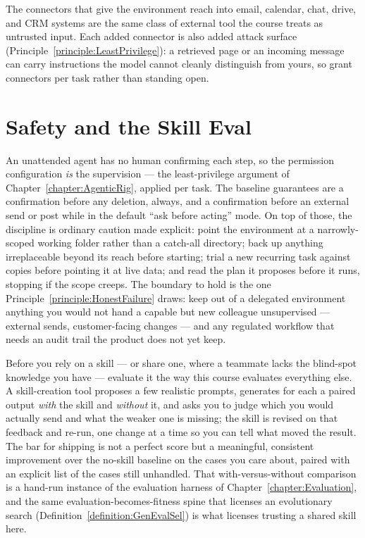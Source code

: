 The connectors that give the environment reach into email, calendar, chat, drive, and CRM systems are the same class of external tool the course treats as untrusted input.
Each added connector is also added attack surface (Principle~\ref{principle:LeastPrivilege}): a retrieved page or an incoming message can carry instructions the model cannot cleanly distinguish from yours, so grant connectors per task rather than standing open.

\section{Safety and the Skill Eval}

An unattended agent has no human confirming each step, so the permission configuration \emph{is} the supervision --- the least-privilege argument of Chapter~\ref{chapter:AgenticRig}, applied per task.
The baseline guarantees are a confirmation before any deletion, always, and a confirmation before an external send or post while in the default ``ask before acting'' mode.
On top of those, the discipline is ordinary caution made explicit: point the environment at a narrowly-scoped working folder rather than a catch-all directory; back up anything irreplaceable beyond its reach before starting; trial a new recurring task against copies before pointing it at live data; and read the plan it proposes before it runs, stopping if the scope creeps.
The boundary to hold is the one Principle~\ref{principle:HonestFailure} draws: keep out of a delegated environment anything you would not hand a capable but new colleague unsupervised --- external sends, customer-facing changes --- and any regulated workflow that needs an audit trail the product does not yet keep.

Before you rely on a skill --- or share one, where a teammate lacks the blind-spot knowledge you have --- evaluate it the way this course evaluates everything else.
A skill-creation tool proposes a few realistic prompts, generates for each a paired output \emph{with} the skill and \emph{without} it, and asks you to judge which you would actually send and what the weaker one is missing; the skill is revised on that feedback and re-run, one change at a time so you can tell what moved the result.
The bar for shipping is not a perfect score but a meaningful, consistent improvement over the no-skill baseline on the cases you care about, paired with an explicit list of the cases still unhandled.
That with-versus-without comparison is a hand-run instance of the evaluation harness of Chapter~\ref{chapter:Evaluation}, and the same evaluation-becomes-fitness spine that licenses an evolutionary search (Definition~\ref{definition:GenEvalSel}) is what licenses trusting a shared skill here.


